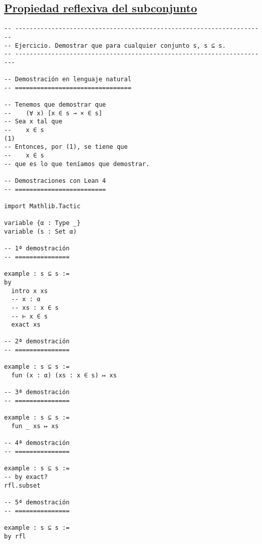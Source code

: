 \subsection{\href{./src/Logica/Propiedad\_reflexiva\_del\_subconjunto.lean}{Propiedad reflexiva del subconjunto}}
\label{sec:org760a0ca}
\begin{verbatim}
-- ---------------------------------------------------------------------
-- Ejercicio. Demostrar que para cualquier conjunto s, s ⊆ s.
-- ----------------------------------------------------------------------

-- Demostración en lenguaje natural
-- ================================

-- Tenemos que demostrar que
--    (∀ x) [x ∈ s → × ∈ s]
-- Sea x tal que
--    x ∈ s                                                          (1)
-- Entonces, por (1), se tiene que
--    x ∈ s
-- que es lo que teníamos que demostrar.

-- Demostraciones con Lean 4
-- =========================

import Mathlib.Tactic

variable {α : Type _}
variable (s : Set α)

-- 1ª demostración
-- ===============

example : s ⊆ s :=
by
  intro x xs
  -- x : α
  -- xs : x ∈ s
  -- ⊢ x ∈ s
  exact xs

-- 2ª demostración
-- ===============

example : s ⊆ s :=
  fun (x : α) (xs : x ∈ s) ↦ xs

-- 3ª demostración
-- ===============

example : s ⊆ s :=
  fun _ xs ↦ xs

-- 4ª demostración
-- ===============

example : s ⊆ s :=
-- by exact?
rfl.subset

-- 5ª demostración
-- ===============

example : s ⊆ s :=
by rfl
\end{verbatim}

